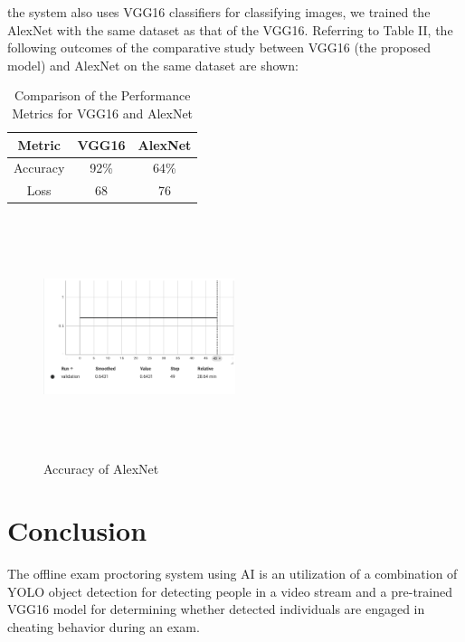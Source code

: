 \documentclass[conference]{IEEEtran}
\begin{document}
the system also uses VGG16 classifiers for classifying images, we trained the  AlexNet with the same dataset as that of the VGG16. Referring to Table II, the following outcomes of the comparative study between VGG16 (the proposed model) and AlexNet on the same dataset are shown:
\begin{table}[htbp]
\caption{Comparison of the Performance Metrics for VGG16 and AlexNet}
\label{tab2} %
\begin{center}
\begin{tabular}{|c|c|c|}
\hline
\textbf{Metric} & \textbf{VGG16} & \textbf{AlexNet} \\ %
\hline
Accuracy & 92\% & 64\%\\ %

\hline
Loss&68&76\\
\hline

\end{tabular}
\end{center}
\end{table}



\begin{figure}[htbp]
\centering
\includegraphics[width=0.5\textwidth, height=7cm]{images/AlexNet.png}  %
\caption{Accuracy of AlexNet}
\label{fig}
\end{figure}



\section{Conclusion}
The offline exam proctoring system using AI is an utilization of a combination of YOLO object detection for detecting people in a video stream and a pre-trained VGG16 model for determining whether detected individuals are engaged in cheating behavior during an exam.
\end{document}
